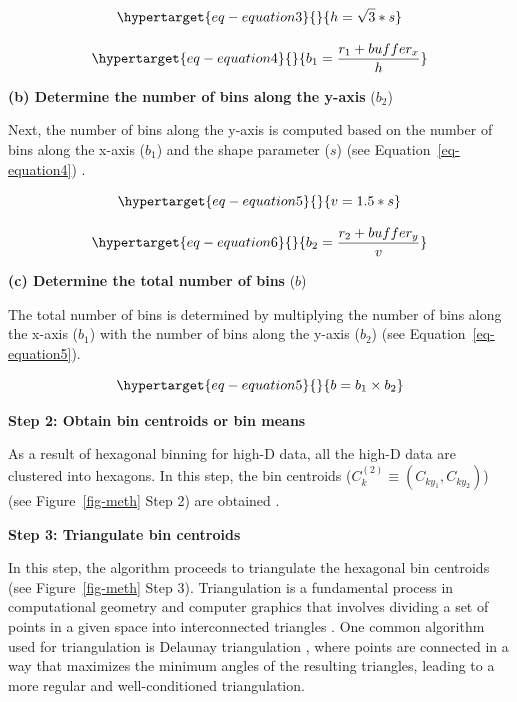 \documentclass[
  12pt]{article}
\begin{document}
\begin{equation}\protect\hypertarget{eq-equation3}{}{
 h = \sqrt{3} * s
}\label{eq-equation3}\end{equation}

\begin{equation}\protect\hypertarget{eq-equation4}{}{
 b_1 = \frac{r_1 + buffer_{x}}{h}
}\label{eq-equation4}\end{equation}

\textbf{(b) Determine the number of bins along the y-axis} (\(b_2\))

Next, the number of bins along the y-axis is computed based on the
number of bins along the x-axis (\(b_1\)) and the shape parameter
(\(s\)) (see Equation~\ref{eq-equation4}) \citep{Carr2013}.

\begin{equation}\protect\hypertarget{eq-equation5}{}{
  v = 1.5 * s
}\label{eq-equation5}\end{equation}

\begin{equation}\protect\hypertarget{eq-equation6}{}{
 b_2 = \frac{r_2 + buffer_{y}}{v}
}\label{eq-equation6}\end{equation}

\textbf{(c) Determine the total number of bins} (\(b\))

The total number of bins is determined by multiplying the number of bins
along the x-axis (\(b_1\)) with the number of bins along the y-axis
(\(b_2\)) (see Equation~\ref{eq-equation5}).

\begin{equation}\protect\hypertarget{eq-equation5}{}{
b = b_1 \times b_2
}\label{eq-equation5}\end{equation}

\textbf{Step 2: Obtain bin centroids or bin means}

As a result of hexagonal binning for high-D data, all the high-D data
are clustered into hexagons. In this step, the bin centroids
(\(C_k^{(2)} \equiv (C_{ky_1}, C_{ky_2})\)) (see Figure~\ref{fig-meth}
Step 2) are obtained \citep{Carr2013}.

\textbf{Step 3: Triangulate bin centroids}

In this step, the algorithm proceeds to triangulate the hexagonal bin
centroids (see Figure~\ref{fig-meth} Step 3). Triangulation is a
fundamental process in computational geometry and computer graphics that
involves dividing a set of points in a given space into interconnected
triangles \citep{article30}. One common algorithm used for triangulation
is Delaunay triangulation \citep[\citet{article54}]{article26}, where
points are connected in a way that maximizes the minimum angles of the
resulting triangles, leading to a more regular and well-conditioned
triangulation.
\end{document}
